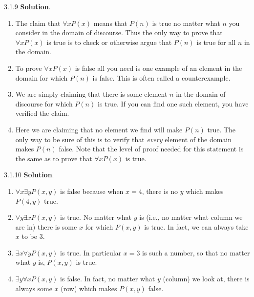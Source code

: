 \documentclass[11pt,]{book}
\theoremstyle{ptxplainnotitle}
\theoremstyle{ptxplaintitle}
\theoremstyle{ptxdefinitionnotitle}
\theoremstyle{ptxdefinitiontitle}
\theoremstyle{ptxdefinitionnotitle}
\theoremstyle{ptxdefinitiontitle}
\theoremstyle{ptxdefinitionnotitle}
\theoremstyle{ptxdefinitiontitle}
\theoremstyle{ptxdefinitiontitlenonumber}
\theoremstyle{ptxdefinitiontitlenonumber}
\numberwithin{equation}{chapter}
\begin{document}
\begin{divisionexercise}{3.1.9}
\textbf{Solution}.\quad%
\hypertarget{p-2112}{}%
\leavevmode%
\begin{enumerate}[label=\alph*.]
\item\hypertarget{li-1052}{}\hypertarget{p-2113}{}%
The claim that \(\forall x P(x)\) means that \(P(n)\) is true no matter what \(n\) you consider in the domain of discourse.  Thus the only way to prove that \(\forall x P(x)\) is true is to check or otherwise argue that \(P(n)\) is true for all \(n\) in the domain.%
\item\hypertarget{li-1053}{}\hypertarget{p-2114}{}%
To prove \(\forall x P(x)\) is false all you need is one example of an element in the domain for which \(P(n)\) is false.  This is often called a counterexample.%
\item\hypertarget{li-1054}{}\hypertarget{p-2115}{}%
We are simply claiming that there is some element \(n\) in the domain of discourse for which \(P(n)\) is true.  If you can find one such element, you have verified the claim.%
\item\hypertarget{li-1055}{}\hypertarget{p-2116}{}%
Here we are claiming that no element we find will make \(P(n)\) true.  The only way to be sure of this is to verify that \emph{every} element of the domain makes \(P(n)\) false.  Note that the level of proof needed for this statement is the same as to prove that \(\forall x P(x)\) is true.%
\end{enumerate}
%
\end{divisionexercise}%
\begin{divisionexercise}{3.1.10}
\textbf{Solution}.\quad%
\hypertarget{p-2150}{}%
\leavevmode%
\begin{enumerate}[label=\alph*.]
\item\hypertarget{li-1084}{}\hypertarget{p-2151}{}%
\(\forall x \exists y P(x,y)\) is false because when \(x = 4\text{,}\) there is no \(y\) which makes \(P(4,y)\) true.%
\item\hypertarget{li-1085}{}\hypertarget{p-2152}{}%
\(\forall y \exists x P(x,y)\) is true.  No matter what \(y\) is (i.e., no matter what column we are in) there is some \(x\) for which \(P(x,y)\) is true.  In fact, we can always take \(x\) to be \(3\text{.}\)%
\item\hypertarget{li-1086}{}\hypertarget{p-2153}{}%
\(\exists x \forall y P(x,y)\) is true. In particular \(x=3\) is such a number, so that no matter what \(y\) is, \(P(x,y)\) is true.%
\item\hypertarget{li-1087}{}\hypertarget{p-2154}{}%
\(\exists y \forall x P(x,y)\) is false. In fact, no matter what \(y\) (column) we look at, there is always some \(x\) (row) which makes \(P(x,y)\) false.%
\end{enumerate}
%
\end{divisionexercise}%
\end{document}
